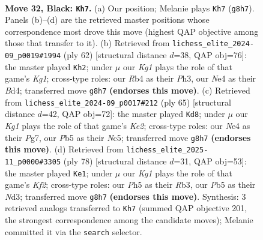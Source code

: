 \documentclass[11pt]{article}
\begin{document}
\clearpage

\begin{figure}[p]\centering
\begin{subfigure}{0.46\textwidth}\centering
\resizebox{\linewidth}{!}{%
\newchessgame
\chessboard[
  setfen={2R3k1/5pp1/4p3/1p1b3p/1r1PnP1P/4P1P1/8/3N1BK1 b - - 3 32},
  showmover=false,
  pgfstyle=straightmove, color=movearrow, markmove={g8-h7}
]}
\caption{}
\end{subfigure}\hfill
\begin{subfigure}{0.46\textwidth}\centering
\resizebox{\linewidth}{!}{%
\newchessgame
\chessboard[
  setfen={6k1/1p4p1/p4p1p/3n4/P2BRP2/1P5P/5PP1/2r3K1 w - - 2 32},
  showmover=false,
  pgfstyle=straightmove, color=movearrow, markmove={g1-h2}
]}
\caption{}
\end{subfigure}
\\[4pt]
\begin{subfigure}{0.46\textwidth}\centering
\resizebox{\linewidth}{!}{%
\newchessgame
\chessboard[
  setfen={8/R3kppp/4p3/1NnbP3/5P2/3r2P1/6BP/6K1 b - - 4 33},
  showmover=false,
  pgfstyle=straightmove, color=movearrow, markmove={e7-d8}
]}
\caption{}
\end{subfigure}\hfill
\begin{subfigure}{0.46\textwidth}\centering
\resizebox{\linewidth}{!}{%
\newchessgame
\chessboard[
  setfen={5k2/1b4p1/1P1n1p1p/p2P4/1p2P3/1R1N1PPP/2r2K2/5B2 w - - 2 40},
  showmover=false,
  pgfstyle=straightmove, color=movearrow, markmove={f2-e1}
]}
\caption{}
\end{subfigure}
\caption{\textbf{Move 32, Black: \texttt{Kh7}.} (a) Our position; Melanie plays \texttt{Kh7} (\texttt{g8h7}). Panels (b)--(d) are the retrieved master positions whose correspondence most drove this move (highest QAP objective among those that transfer to it). (b) Retrieved from \texttt{lichess\_elite\_2024-09\_p0019\#1994} (ply 62) [structural distance $d$=38, QAP obj=76]: the master played \texttt{Kh2}; under $\mu$ our \emph{Kg1} plays the role of that game's \emph{Kg1}; cross-type roles: our \emph{R}b4 as their \emph{P}h3, our \emph{N}e4 as their \emph{B}d4; transferred move \texttt{g8h7} \textbf{(endorses this move)}. (c) Retrieved from \texttt{lichess\_elite\_2024-09\_p0017\#212} (ply 65) [structural distance $d$=42, QAP obj=72]: the master played \texttt{Kd8}; under $\mu$ our \emph{Kg1} plays the role of that game's \emph{Ke2}; cross-type roles: our \emph{N}e4 as their \emph{P}g7, our \emph{P}b5 as their \emph{N}c5; transferred move \texttt{g8h7} \textbf{(endorses this move)}. (d) Retrieved from \texttt{lichess\_elite\_2025-11\_p0000\#3305} (ply 78) [structural distance $d$=31, QAP obj=53]: the master played \texttt{Ke1}; under $\mu$ our \emph{Kg1} plays the role of that game's \emph{Kf2}; cross-type roles: our \emph{P}h5 as their \emph{R}b3, our \emph{P}b5 as their \emph{N}d3; transferred move \texttt{g8h7} \textbf{(endorses this move)}. Synthesis: 3 retrieved analogs transferred to \texttt{Kh7} (summed QAP objective 201, the strongest correspondence among the candidate moves); Melanie committed it via the \texttt{search} selector.}
\label{fig:thought-m63}
\end{figure}
\end{document}
